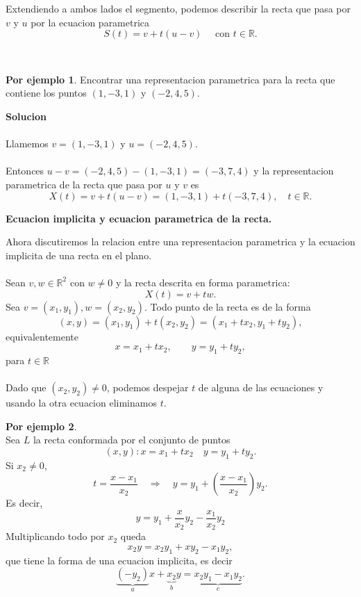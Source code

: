 \documentclass{article}
\theoremstyle{definition}
\theoremstyle{definition}
\newtheorem*{ej}{Por ejemplo}
\theoremstyle{remark}
\begin{document}
Extendiendo a ambos lados el segmento, podemos describir la recta que pasa por $v$ y $u$ por la ecuacion parametrica \[
  S(t)=v+t(u-v) \quad \text{ con } t \in \mathbb{R}.
\]
\begin{figure}[h]
\centering
\def\svgwidth{0.55\textwidth}

\end{figure}\\
\begin{ej}
  Encontrar una representacion parametrica para la recta que contiene los puntos $(1,-3,1)$ y $(-2,4,5)$.
\end{ej}
\textbf{Solucion}\\\\
Llamemos $v=(1,-3,1)$ y $u=(-2,4,5)$.
\\\\
Entonces $u-v=(-2,4,5)-(1,-3,1)=(-3,7,4)$ y la representacion parametrica de la recta que pasa por $u$ y $v$ es \[
X(t)=v+t(u-v)=(1,-3,1)+t(-3,7,4), \quad t \in \mathbb{R}.\]

\begin{center}
  \textbf{Ecuacion implicita y ecuacion parametrica de la recta.}
\end{center}
Ahora discutiremos la relacion entre una representacion parametrica y la ecuacion implicita de una recta en el plano.
\\\\ Sean $v,w \in \mathbb{R}^2$ con $w \neq 0$ y la recta descrita en forma parametrica: \[X(t)=v+tw.\]
Sea $v=(x_1,y_1), w=(x_2,y_2)$. Todo punto de la recta es de la forma \[
  (x,y)=(x_1,y_1)+t(x_2,y_2)=(x_1+tx_2,y_1+ty_2),
  \] equivalentemente \[
x=x_1+tx_2, \quad \quad y=y_1+ty_2,
\]para $t \in \mathbb{R}$
\\\\
Dado que $(x_2,y_2)\neq 0$, podemos despejar $t$ de alguna de las ecuaciones y usando la otra ecuacion eliminamos $t$.
\begin{ej} \;\\ Sea $L$ la recta conformada por el conjunto de puntos
  \[(x,y) : x=x_1+tx_2 \quad y=y_1+ty_2.\]
  Si $x_2 \neq 0$, $$t=\frac{x-x_1}{x_2} \quad \Rightarrow \quad y=y_1+\left(\frac{x-x_1}{x_2}\right)y_2.$$ Es decir, $$y=y_1+\frac{x}{x_2}y_2 - \frac{x_1}{x_2}y_2$$ 
  Multiplicando todo por $x_2$ queda $$x_2y=x_2y_1+xy_2-x_1y_2,$$
  que tiene la forma de una ecuacion implicita, es decir \[
    \underbrace{(-y_2)}_{a}x+\underbrace{x_2}_{b}y=\underbrace{x_2y_1-x_1y_2}_{c}.
  \]
\end{ej}
\pagebreak
\end{document}

